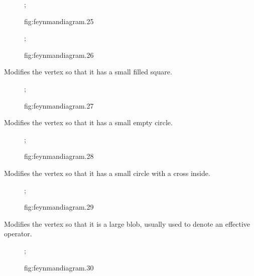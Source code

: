 \documentclass[UTF8]{article}
\begin{document}
\begin{figure}[hp]
    \centering
    ;
    \caption{fig:feynmandiagram.25}
    \label{fig:feynmandiagram.25}
\end{figure}

\begin{figure}[hp]
    \centering
    ;
    \caption{fig:feynmandiagram.26}
    \label{fig:feynmandiagram.26}
\end{figure}

Modifies the vertex so that it has a small filled square.

\begin{figure}[hp]
    \centering
    ;
    \caption{fig:feynmandiagram.27}
    \label{fig:feynmandiagram.27}
\end{figure}

Modifies the vertex so that it has a small empty circle.

\begin{figure}[hp]
    \centering
    ;
    \caption{fig:feynmandiagram.28}
    \label{fig:feynmandiagram.28}
\end{figure}

Modifies the vertex so that it has a small circle with a cross inside.


\begin{figure}[hp]
    \centering
    ;
    \caption{fig:feynmandiagram.29}
    \label{fig:feynmandiagram.29}
\end{figure}

Modifies the vertex so that it is a large blob, usually used to denote an effective operator.

\begin{figure}[hp]
    \centering
    ;
    \caption{fig:feynmandiagram.30}
    \label{fig:feynmandiagram.30}
\end{figure}
\end{document}
